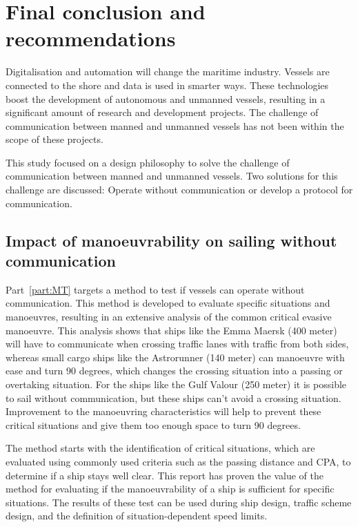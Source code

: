 \chapter{Final conclusion and recommendations}
Digitalisation and automation will change the maritime industry. Vessels are connected to the shore and data is used in smarter ways. These technologies boost the development of autonomous and unmanned vessels, resulting in a significant amount of research and development projects. The challenge of communication between manned and unmanned vessels has not been within the scope of these projects.

This study focused on a design philosophy to solve the challenge of communication between manned and unmanned vessels. Two solutions for this challenge are discussed: Operate without communication or develop a protocol for communication.

\section{Impact of manoeuvrability on sailing without communication}
Part~\ref{part:MT} targets a method to test if vessels can operate without communication. This method is developed to evaluate specific situations and manoeuvres, resulting in an extensive analysis of the common critical evasive manoeuvre. This analysis shows that ships like the Emma Maersk (400 meter) will have to communicate when crossing traffic lanes with traffic from both sides, whereas small cargo ships like the Astrorunner (140 meter) can manoeuvre with ease and turn 90 degrees, which changes the crossing situation into a passing or overtaking situation. For the ships like the Gulf Valour (250 meter) it is possible to sail without communication, but these ships can't avoid a crossing situation. Improvement to the manoeuvring characteristics will help to prevent these critical situations and give them too enough space to turn 90 degrees.

The method starts with the identification of critical situations, which are evaluated using commonly used criteria such as the passing distance and \ac{CPA}, to determine if a ship stays well clear. This report has proven the value of the method for evaluating if the manoeuvrability of a ship is sufficient for specific situations. The results of these test can be used during ship design, traffic scheme design, and the definition of situation-dependent speed limits.


